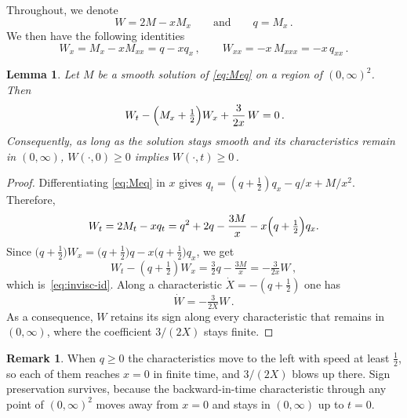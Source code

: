 \documentclass[12pt]{amsart}
\numberwithin{equation}{section}
\theoremstyle{plain}
\newtheorem{lemma}[theorem]{Lemma}
\theoremstyle{definition}
\newtheorem{remark}[theorem]{Remark}
\begin{document}
Throughout, we denote
\begin{equation}
	\label{eq:W}
	W=2M-xM_x \qquad  \text{and} \qquad q=M_x \,.
\end{equation}
We then have the following identities
\begin{equation}\label{eq:Wderivs}
	W_x = M_x-xM_{xx} = q-xq_x \,,
	\qquad
	W_{xx} = -x\,M_{xxx} = -x\,q_{xx} \,.
\end{equation}

\begin{lemma}\label{lem:inviscid}
	Let $M$ be a smooth solution of \eqref{eq:Meq} on a region of $(0,\infty)^2$.
	Then
	\begin{equation}\label{eq:invisc-id}
		\,W_t-\Bigl(M_x+\tfrac12\Bigr)W_x+\frac{3}{2x}\,W=0\,.
	\end{equation}
	Consequently, as long as the solution stays smooth and its characteristics
	remain in $(0,\infty)$,
	$W(\cdot,0)\ge0$ implies $W(\cdot,t)\ge0$\,.
\end{lemma}

\begin{proof}
	Differentiating \eqref{eq:Meq} in $x$ gives
	$q_t=(q+\tfrac12)q_x-q/x+M/x^2$.
	Therefore,
	\[
		W_t=2M_t-xq_t
		=q^2+2q-\frac{3M}{x}-x\Bigl(q+\tfrac12\Bigr)q_x .
	\]
	Since $\bigl(q+\tfrac12\bigr)W_x=\bigl(q+\tfrac12\bigr)q
		-x\bigl(q+\tfrac12\bigr)q_x$, we get
	\begin{equation*}
		W_t-(q+\tfrac12)W_x=\tfrac32 q-\tfrac{3M}{x}=-\tfrac{3}{2x}W \,,
	\end{equation*}
	which is~\eqref{eq:invisc-id}. Along a characteristic $\dot
		X=-(q+\tfrac12)$ one has
	\begin{equation*}
		\dot W=-\tfrac{3}{2X}W\,.
	\end{equation*}
	As a consequence, $W$ retains its sign along every characteristic that
	remains in $(0,\infty)$, where the coefficient $3/(2X)$ stays finite.
\end{proof}

\begin{remark}
	When $q\ge0$ the characteristics move to the left
	with speed at least $\tfrac12$, so each of them reaches $x=0$ in finite
	time, and $3/(2X)$ blows up there. Sign preservation survives, because the
	backward-in-time characteristic through any point of $(0,\infty)^2$ moves
	away from $x=0$ and stays in $(0,\infty)$ up to $t=0$.
\end{remark}
\end{document}
